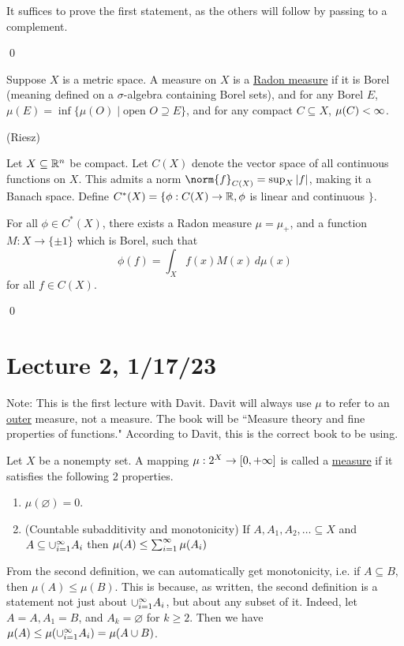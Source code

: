 \documentclass[x11names,reqno,14pt]{extarticle}
\newcommand{\seq}[2][\oo]{_{#2 = 1}^#1}
\begin{document}
\proof

It suffices to prove the first statement, as the others will follow by passing to a complement. 

\qed


Suppose $X$ is a metric space. A measure on $X$ is a \underline{Radon measure} if it is Borel (meaning defined on a $\sigma$-algebra containing Borel sets), and for any Borel $E$, $\mu(E) = \inf\{\mu(O) \mid \text{open }O \supseteq E\}$, and for any compact $C\subseteq X$, $\mu(C)<\infty$. 

\thm (Riesz)

Let $X \subseteq \mathbb{R}^n$ be compact. Let $C(X)$ denote the vector space of all continuous functions on $X$. This admits a norm $\norm{f}_{C(X)} = \sup_X|f|$, making it a Banach space. Define $C^*(X) = \{\phi:C(X)\to\mathbb{R}, \phi$ is linear and continuous $\}$. 

For all $\phi \in C^*(X)$, there exists a Radon measure $\mu = \mu_+$, and a function $M:X\to\{\pm1\}$ which is Borel, such that
\[
\phi(f) = \int_Xf(x)M(x)\,d\mu(x)
\]
for all $f \in C(X)$. 

\proof

\qed

\section*{Lecture 2, 1/17/23}

Note: This is the first lecture with Davit. Davit will always use $\mu$ to refer to an \underline{outer} measure, not a measure. The book will be ``Measure theory and fine properties of functions." According to Davit, this is the correct book to be using. 


Let $X$ be a nonempty set. A mapping $\mu:2^X\to[0,+\infty]$ is called a \underline{measure} if it satisfies the following 2 properties.

\begin{enumerate}
\item $\mu(\varnothing) = 0$. 
\item (Countable subadditivity and monotonicity) If $A, A_1, A_2, \dots \subseteq X$ and $A \subseteq \cup\seq{i}A_i$ then $\mu(A)\leq\sum\seq{i}\mu(A_i)$
\end{enumerate}

\rem From the second definition, we can automatically get monotonicity, i.e. if $A\subseteq B$, then $\mu(A)\leq\mu(B)$. This is because, as written, the second definition is a statement not just about $\cup\seq{i}A_i$, but about any subset of it. Indeed, let $A = A, A_1 = B$, and $A_k = \varnothing$ for $k\geq 2$. Then we have $\mu(A)\leq\mu(\cup\seq{i}A_i) = \mu(A\cup B)$. 
\end{document}
